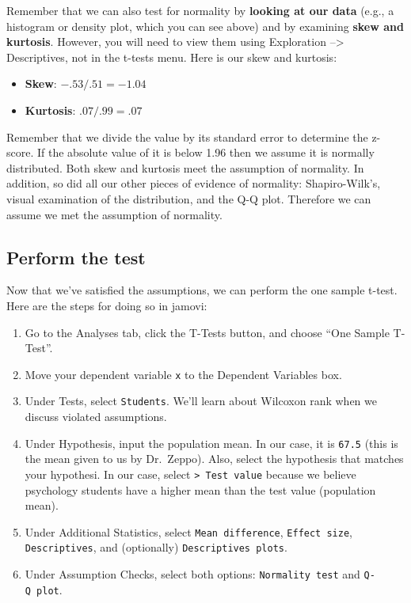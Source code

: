 \documentclass[
]{book}
\begin{document}
Remember that we can also test for normality by \textbf{looking at our data} (e.g., a histogram or density plot, which you can see above) and by examining \textbf{skew and kurtosis}. However, you will need to view them using Exploration --\textgreater{} Descriptives, not in the t-tests menu. Here is our skew and kurtosis:

\begin{itemize}
\item
  \textbf{Skew}: \(-.53/.51 = -1.04\)
\item
  \textbf{Kurtosis}: \(.07/.99 = .07\)
\end{itemize}

Remember that we divide the value by its standard error to determine the z-score. If the absolute value of it is below 1.96 then we assume it is normally distributed. Both skew and kurtosis meet the assumption of normality. In addition, so did all our other pieces of evidence of normality: Shapiro-Wilk's, visual examination of the distribution, and the Q-Q plot. Therefore we can assume we met the assumption of normality.

\hypertarget{perform-the-test}{%
\subsection{Perform the test}\label{perform-the-test}}

Now that we've satisfied the assumptions, we can perform the one sample t-test. Here are the steps for doing so in jamovi:

\begin{enumerate}
\def\labelenumi{\arabic{enumi}.}
\item
  Go to the Analyses tab, click the T-Tests button, and choose ``One Sample T-Test''.
\item
  Move your dependent variable \texttt{x} to the Dependent Variables box.
\item
  Under Tests, select \texttt{Student\textquotesingle{}s}. We'll learn about Wilcoxon rank when we discuss violated assumptions.
\item
  Under Hypothesis, input the population mean. In our case, it is \texttt{67.5} (this is the mean given to us by Dr.~Zeppo). Also, select the hypothesis that matches your hypothesi. In our case, select \texttt{\textgreater{}\ Test\ value} because we believe psychology students have a higher mean than the test value (population mean).
\item
  Under Additional Statistics, select \texttt{Mean\ difference}, \texttt{Effect\ size}, \texttt{Descriptives}, and (optionally) \texttt{Descriptives\ plots}.
\item
  Under Assumption Checks, select both options: \texttt{Normality\ test} and \texttt{Q-Q\ plot}.
\end{enumerate}
\end{document}
